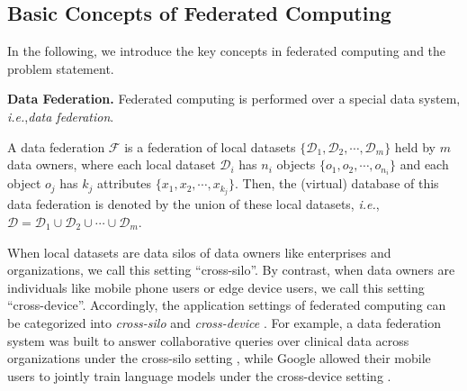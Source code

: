 \documentclass[11pt]{article}
\newcommand{\ie}{\textit{i.e.},\xspace}
\newcommand{\fakeparagraph}[1]{\vspace{1mm}\noindent\textbf{#1.}}
\newcommand{\FNew}{\mathcal{F}}
\newcommand{\D}{\mathcal{D}}
\newcommand{\obj}{o}
\begin{document}
\subsection{Basic Concepts of Federated Computing}\label{sec:concept-def}

In the following, we introduce the key concepts in federated computing
and the problem statement.

\fakeparagraph{Data Federation}
Federated computing is performed over a special data system, \ie \textit{data federation}.

\begin{definition}\label{def:fed-data}
A data federation $\FNew$ is a federation of local datasets $\{\D_1, \D_2, \cdots, \D_m\}$ held by $m$ data owners, where each local dataset $\D_i$ has $n_i$ objects $\{\obj_1, \obj_2, \cdots, \obj_{n_i}\}$ and each object $\obj_j$ has $k_j$ attributes $\{x_1, x_2, \cdots, x_{k_j}\}$.
Then, the (virtual) database of this data federation is denoted by the union of these local datasets, \ie $\D = \D_1 \cup \D_2 \cup \cdots \cup \D_m$.
\end{definition}

When local datasets are data silos of data owners like enterprises and organizations,
we call this setting ``cross-silo''.
By contrast, when data owners are individuals like mobile phone users or edge device users,
we call this setting ``cross-device''.
Accordingly, the application settings of federated computing can be categorized into \textit{cross-silo} and \textit{cross-device} \cite{Yongxin-DBLP:journals/ftml/KairouzMABBBBCC21}.
For example, a data federation system was built to answer collaborative queries over clinical data across organizations under the cross-silo setting \cite{Yongxin-science2016A}, while Google allowed their mobile users to jointly train language models under the cross-device setting \cite{Yongxin-DBLP:conf/aistats/McMahanMRHA17}.
\end{document}
